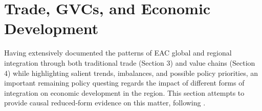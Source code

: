 \documentclass[a4paper]{article}
\begin{document}
%
%
 

\section{Trade, GVCs, and Economic Development}

Having extensively documented the patterns of EAC global and regional integration through both traditional trade (Section 3) and value chains (Section 4) while highlighting salient trends, imbalances, and possible policy priorities, an important remaining policy questing regards the impact of different forms of integration on economic development in the region. This section attempts to provide causal reduced-form evidence on this matter, following \citet{Kummritz20161}. \newline
\end{document}
